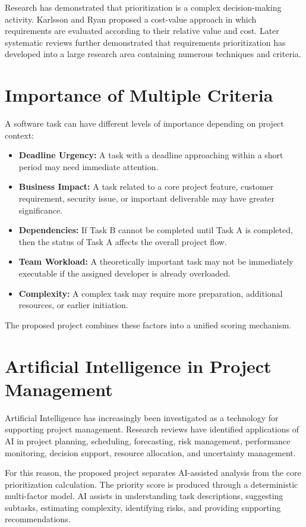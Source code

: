 \documentclass[12pt,a4paper,oneside]{report}
\begin{document}
Research has demonstrated that prioritization is a complex decision-making activity. Karlsson and Ryan proposed a cost-value approach in which requirements are evaluated according to their relative value and cost. Later systematic reviews further demonstrated that requirements prioritization has developed into a large research area containing numerous techniques and criteria.

\section{Importance of Multiple Criteria}

A software task can have different levels of importance depending on project context:

\begin{itemize}[noitemsep]
  \item \textbf{Deadline Urgency:} A task with a deadline approaching within a short period may need immediate attention.
  \item \textbf{Business Impact:} A task related to a core project feature, customer requirement, security issue, or important deliverable may have greater significance.
  \item \textbf{Dependencies:} If Task B cannot be completed until Task A is completed, then the status of Task A affects the overall project flow.
  \item \textbf{Team Workload:} A theoretically important task may not be immediately executable if the assigned developer is already overloaded.
  \item \textbf{Complexity:} A complex task may require more preparation, additional resources, or earlier initiation.
\end{itemize}

The proposed project combines these factors into a unified scoring mechanism.

\section{Artificial Intelligence in Project Management}

Artificial Intelligence has increasingly been investigated as a technology for supporting project management. Research reviews have identified applications of AI in project planning, scheduling, forecasting, risk management, performance monitoring, decision support, resource allocation, and uncertainty management.

For this reason, the proposed project separates AI-assisted analysis from the core prioritization calculation. The priority score is produced through a deterministic multi-factor model. AI assists in understanding task descriptions, suggesting subtasks, estimating complexity, identifying risks, and providing supporting recommendations.
\end{document}
